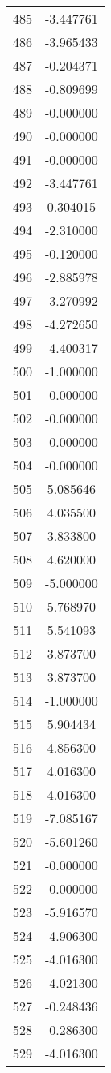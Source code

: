 \documentclass[12pt]{article}
\begin{document}
\begin{longtable}{@{}cc@{}}
485 & -3.447761 \\
486 & -3.965433 \\
487 & -0.204371 \\
488 & -0.809699 \\
489 & -0.000000 \\
490 & -0.000000 \\
491 & -0.000000 \\
492 & -3.447761 \\
493 & 0.304015 \\
494 & -2.310000 \\
495 & -0.120000 \\
496 & -2.885978 \\
497 & -3.270992 \\
498 & -4.272650 \\
499 & -4.400317 \\
500 & -1.000000 \\
501 & -0.000000 \\
502 & -0.000000 \\
503 & -0.000000 \\
504 & -0.000000 \\
505 & 5.085646 \\
506 & 4.035500 \\
507 & 3.833800 \\
508 & 4.620000 \\
509 & -5.000000 \\
510 & 5.768970 \\
511 & 5.541093 \\
512 & 3.873700 \\
513 & 3.873700 \\
514 & -1.000000 \\
515 & 5.904434 \\
516 & 4.856300 \\
517 & 4.016300 \\
518 & 4.016300 \\
519 & -7.085167 \\
520 & -5.601260 \\
521 & -0.000000 \\
522 & -0.000000 \\
523 & -5.916570 \\
524 & -4.906300 \\
525 & -4.016300 \\
526 & -4.021300 \\
527 & -0.248436 \\
528 & -0.286300 \\
529 & -4.016300 \\

\end{longtable}
\end{document}
